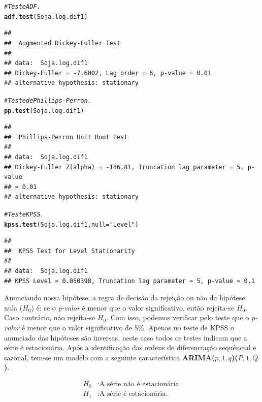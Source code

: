 \documentclass[
	12pt,				%
	openright,			%
	oneside,      %
	a4paper,			%
	english,			%
	french,				%
	spanish,			%
	brazil,				%
	]{abntex2}\usepackage[]{graphicx}\usepackage[table]{xcolor}
\makeatletter
\newcommand{\hlstr}[1]{\textcolor[rgb]{0.192,0.494,0.8}{#1}}%
\newcommand{\hlcom}[1]{\textcolor[rgb]{0.678,0.584,0.686}{\textit{#1}}}%
\newcommand{\hlstd}[1]{\textcolor[rgb]{0.345,0.345,0.345}{#1}}%
\newcommand{\hlkwc}[1]{\textcolor[rgb]{0.333,0.667,0.333}{#1}}%
\newcommand{\hlkwd}[1]{\textcolor[rgb]{0.737,0.353,0.396}{\textbf{#1}}}%
\newenvironment{kframe}{%
 \def\at@end@of@kframe{}%
 \ifinner\ifhmode%
  \def\at@end@of@kframe{\end{minipage}}%
  \begin{minipage}{\columnwidth}%
 \fi\fi%
 \def\FrameCommand##1{\hskip\@totalleftmargin \hskip-\fboxsep
 \colorbox{shadecolor}{##1}\hskip-\fboxsep
     \hskip-\linewidth \hskip-\@totalleftmargin \hskip\columnwidth}%
 \MakeFramed {\advance\hsize-\width
   \@totalleftmargin\z@ \linewidth\hsize
   \@setminipage}}%
 {\par\unskip\endMakeFramed%
 \at@end@of@kframe}
\newenvironment{knitrout}{}{} %
\theoremstyle{definition}
\theoremstyle{remark}
\makeatother
\begin{document}
\begin{knitrout}
\color{fgcolor}\begin{kframe}
\begin{alltt}
\hlcom{# Teste ADF.}
\hlkwd{adf.test}\hlstd{(Soja.log.dif1)}
\end{alltt}
\begin{verbatim}
## 
## 	Augmented Dickey-Fuller Test
## 
## data:  Soja.log.dif1
## Dickey-Fuller = -7.6002, Lag order = 6, p-value = 0.01
## alternative hypothesis: stationary
\end{verbatim}
\begin{alltt}
\hlcom{# Teste de Phillips-Perron.}
\hlkwd{pp.test}\hlstd{(Soja.log.dif1)}
\end{alltt}
\begin{verbatim}
## 
## 	Phillips-Perron Unit Root Test
## 
## data:  Soja.log.dif1
## Dickey-Fuller Z(alpha) = -186.81, Truncation lag parameter = 5, p-value
## = 0.01
## alternative hypothesis: stationary
\end{verbatim}
\begin{alltt}
\hlcom{# Teste KPSS.}
\hlkwd{kpss.test}\hlstd{(Soja.log.dif1,} \hlkwc{null} \hlstd{=} \hlstr{"Level"}\hlstd{)}
\end{alltt}
\begin{verbatim}
## 
## 	KPSS Test for Level Stationarity
## 
## data:  Soja.log.dif1
## KPSS Level = 0.050398, Truncation lag parameter = 5, p-value = 0.1
\end{verbatim}
\end{kframe}
\end{knitrout}

Anunciando nossa hipótese, a regra de decisão da rejeição ou não da hipótese nula ($H_0$) é: se o \textit{p-valor} é menor que o valor significativo, então rejeita-se $H_0$. Caso contrário, não rejeita-se $H_0$. Com isso, podemos verificar pelo teste que o \textit{p-valor} é menor que o valor significativo de 5\%. Apenas no teste de KPSS o anunciado das hipóteses são inversas, neste caso todos os testes indicam que a série é estacionária. Após a identificação das ordens de diferenciação sequêncial e sazonal, tem-se um modelo com a seguinte característica \textbf{ARIMA($p,1,q$)($P,1,Q$)}.

\begin{equation*}
\begin{split}
H_0 & : \text{A série não é estacionária.} \\
H_1 & : \text{A série é estacionária.}
\end{split}
\end{equation*}
\end{document}
